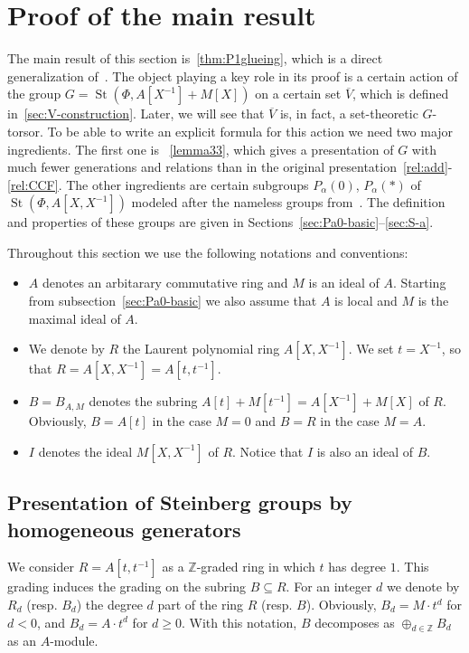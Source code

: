 \documentclass[oneside, 8pt]{amsart}
\theoremstyle{remark}
\theoremstyle{definition}
\numberwithin{lemma}{section}
\numberwithin{prop}{section}
\numberwithin{corollary}{section}
\numberwithin{externaltheorem}{section}
\DeclareMathOperator{\St}{St}
\newcommand{\inv}{^{-1}}
\numberwithin{equation}{section}
\begin{document}
\section{Proof of the main result}
The main result of this section is~\cref{thm:P1glueing}, which is a direct generalization of~\cite[Proposition~4.3]{Tu83}. 
The object playing a key role in its proof is a certain action of the group $G = \St(\Phi, A[X\inv] + M[X])$ on a certain set $\overline{V}$, which is defined in~\cref{sec:V-construction}. Later, we will see that $\overline{V}$ is, in fact, a set-theoretic $G$-torsor.
To be able to write an explicit formula for this action we need two major ingredients. The first one is ~\cref{lemma33}, which gives a presentation of $G$ with much fewer generations and relations than in the original presentation~\eqref{rel:add}-\eqref{rel:CCF}. The other ingredients are certain subgroups $P_\alpha(0)$, $P_\alpha(*)$ of $\St(\Phi, A[X, X\inv])$ modeled after the nameless groups from~\cite[Lemma~3.4]{Tu83}. The definition and properties of these groups are given in Sections~\ref{sec:Pa0-basic}--\ref{sec:S-a}.

Throughout this section we use the following notations and conventions:
\begin{itemize}
 \item $A$ denotes an arbitarary commutative ring and $M$ is an ideal of $A$. Starting from subsection~\ref{sec:Pa0-basic} we also assume that $A$ is local and $M$ is the maximal ideal of $A$.
 \item We denote by $R$ the Laurent polynomial ring $A[X, X^{-1}]$. We set $t = X^{-1}$, so that $R = A[X, X^{-1}] = A[t, t^{-1}]$.
 \item $B = B_{A, M}$ denotes the subring $A[t] + M[t^{-1}] = A[X^{-1}] + M[X]$ of $R$. Obviously, $B = A[t]$ in the case $M=0$ and $B = R$ in the case $M=A$.
 \item $I$ denotes the ideal $M[X, X^{-1}]$ of $R$. Notice that $I$ is also an ideal of $B$.
 \end{itemize}
\subsection{Presentation of Steinberg groups by homogeneous generators}
\label{sec:presentation}
We consider $R = A[t, t\inv]$ as a $\mathbb{Z}$-graded ring in which $t$ has degree $1$. This grading induces the grading on the subring $B \subseteq R$. For an integer $d$ we denote by $R_d$ (resp. $B_d$) the degree $d$ part of the ring $R$ (resp. $B$). Obviously, $B_d=M \cdot t^d$ for $d<0$, and $B_d=A \cdot t^d$ for $d\geq0$. With this notation, $B$ decomposes as $\oplus_{d\in\mathbb Z}B_d$ as an $A$-module. 
\end{document}
